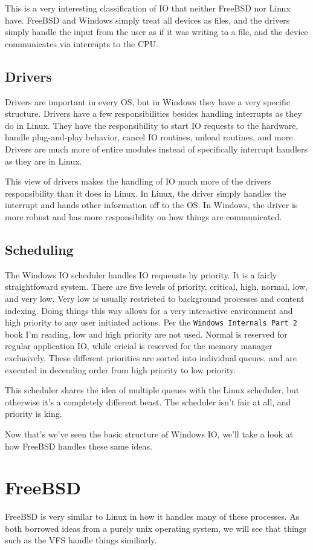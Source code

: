 \documentclass[10pt,letterpaper,onecolumn,draftclsnofoot]{IEEEtran}
\begin{document}
 This is a very interesting classification of IO that neither FreeBSD nor Linux
 have. FreeBSD and Windows simply treat all devices as files, and the drivers
 simply handle the input from the user as if it was writing to a file, and the
 device communicates via interrupts to the CPU.

 \subsection{Drivers}
 Drivers are important in every OS, but in Windows they have a very specific
 structure. Drivers have a few responsibilities besides handling interrupts as
 they do in Linux. They have the responsibility to start IO requests to the hardware,
 handle plug-and-play behavior, cancel IO routines, unload routines, and more.
 Drivers are much more of entire modules instead of specifically interrupt handlers
 as they are in Linux. \cite{internals2}

 This view of drivers makes the handling of IO much more of the drivers responsibility
 than it does in Linux. In Linux, the driver simply handles the interrupt and hands
 other information off to the OS. In Windows, the driver is more robust and has
 more responsibility on how things are communicated.
 \subsection{Scheduling}
 The Windows IO scheduler handles IO requeusts by priority. It is a fairly
 straightfoward system. There are five levels of priority, critical, high, normal,
 low, and very low. Very low is usually restricted to background processes and
 content indexing. Doing things this way allows for a very interactive environment
 and high priority to any user initiated actions. Per the \texttt{Windows Internals Part 2}
 book I'm reading, low and high priority are not used. Normal is reserved for
 regular application IO, while cricial is reserved for the memory manager exclusively.
 These different priorities are sorted into individual queues, and are executed
 in decending order from high priority to low priority.

 This scheduler shares the idea of multiple queues with the Linux scheduler, but
 otherwise it's a completely different beast. The scheduler isn't fair at all,
 and priority is king.\cite{internals2}

 Now that's we've seen the basic structure of Windows IO, we'll take a look at
 how FreeBSD handles these same ideas.
\section{FreeBSD}
  FreeBSD is very similar to Linux in how it handles many of these processes. As
  both borrowed ideas from a purely unix operating system, we will see that things
  such as the VFS handle things similiarly.
\end{document}

